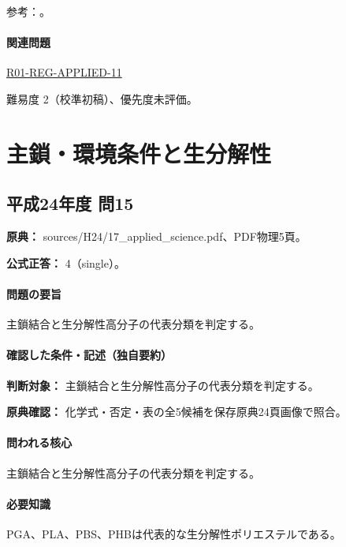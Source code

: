 \par 参考：\cite{organic_benzene}。

\paragraph{関連問題} \hyperref[q:r01-reg-applied-11]{R01-REG-APPLIED-11}

\par 難易度 2（校準初稿）、優先度未評価。

\section{主鎖・環境条件と生分解性}

\subsection{平成24年度 問15}
\label{q:h24-reg-applied-15}

\noindent\textbf{原典：} sources/H24/17\_applied\_science.pdf、PDF物理5頁。

\textbf{公式正答：} 4（single）。

\paragraph{問題の要旨} 主鎖結合と生分解性高分子の代表分類を判定する。

\paragraph{確認した条件・記述（独自要約）}\mbox{}\par

\noindent\textbf{判断対象：} 主鎖結合と生分解性高分子の代表分類を判定する。\par

\noindent\textbf{原典確認：} 化学式・否定・表の全5候補を保存原典24頁画像で照合。\par

\paragraph{問われる核心} 主鎖結合と生分解性高分子の代表分類を判定する。

\paragraph{必要知識} PGA、PLA、PBS、PHBは代表的な生分解性ポリエステルである。

